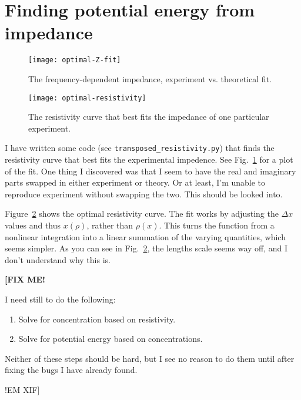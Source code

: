 \documentclass[twocolumn]{article}
\newcommand\fixme[1]{{\bf\color{red}[FIX ME! #1 !EM XIF]}}
\begin{document}
\clearpage

\section{Finding potential energy from impedance}

\begin{figure}
  \texttt{[image: optimal-Z-fit]}
  \caption{The frequency-dependent impedance, experiment
    vs. theoretical fit.}\label{fig:optimal-Z-fit}
\end{figure}

\begin{figure}
  \texttt{[image: optimal-resistivity]}
  \caption{The resistivity curve that best fits the impedance of one
    particular experiment.}\label{fig:optimal-resistivity}
\end{figure}

I have written some code (see \texttt{transposed\_resistivity.py}) that
finds the resistivity curve that best fits the experimental
impedence.  See Fig.~\ref{fig:optimal-Z-fit} for a plot of the fit.
One thing I discovered was that I seem to have the real and imaginary
parts swapped in either experiment or theory.  Or at least, I'm unable
to reproduce experiment without swapping the two.  This should be
looked into.

Figure~\ref{fig:optimal-resistivity} shows the optimal resistivity
curve.  The fit works by adjusting the $\Delta x$ values and thus
$x(\rho)$, rather than $\rho(x)$.  This turns the function from a
nonlinear integration into a linear summation of the varying
quantities, which seems simpler.  As you can see in
Fig.~\ref{fig:optimal-resistivity}, the lengths scale seems way off,
and I don't understand why this is.

\fixme{

  I need still to do the following:
  \begin{enumerate}
  \item Solve for concentration based on resistivity.
  \item Solve for potential energy based on concentrations.
  \end{enumerate}
  Neither of these steps should be hard, but I see no reason to do
  them until after fixing the bugs I have already found.

}



\clearpage

\appendix
\end{document}
